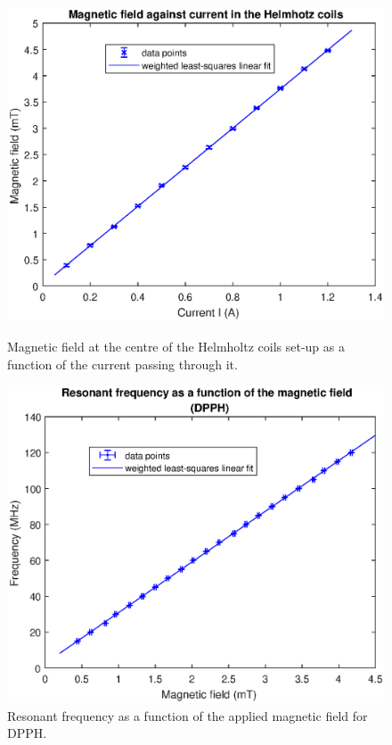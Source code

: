 \documentclass[a4paper]{jpconf}
\numberwithin{equation}{section}
\begin{document}
\begin{figure}[htbp]
	\begin{minipage}[b]{2.9in}
		\includegraphics[scale=0.59]{ESR_calibration.eps}
		\caption{Magnetic field at the centre of the Helmholtz coils set-up as a function of the current passing through it.}
		\label{fig: HC calibration curve}
	\end{minipage}
    \hspace{1.5pc}
	\begin{minipage}[b]{3in}
		\includegraphics[scale=0.6]{DPPH.eps}
		\caption{Resonant frequency as a function of the applied magnetic field for DPPH.}
		\label{fig: DPPH resonance}
	\end{minipage}
\end{figure}
\end{document}
